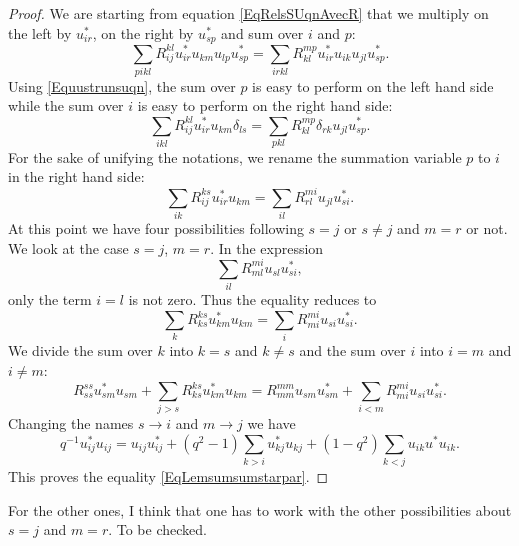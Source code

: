 \begin{proof}
    We are starting from equation \eqref{EqRelsSUqnAvecR} that we multiply on the left by \( u^*_{ir}\), on the right by \( u^*_{sp}\) and sum over \( i\) and \( p\):
    \begin{equation}
        \sum_{pikl}R^{kl}_{ij}u^*_{ir}u_{km}u_{lp}u^*_{sp}=\sum_{irkl}R^{mp}_{kl}u^*_{ir}u_{ik}u_{jl}u^*_{sp}.
    \end{equation}
    Using \eqref{Equustrunsuqn}, the sum over \( p\) is easy to perform on the left hand side while the sum over \( i\) is easy to perform on the right hand side:
    \begin{equation}
        \sum_{ikl}R^{kl}_{ij}u^*_{ir}u_{km}\delta_{ls}=\sum_{pkl}R^{mp}_{kl}\delta_{rk}u_{jl}u^*_{sp}.
    \end{equation}
    For the sake of unifying the notations, we rename the summation variable \( p\) to \( i\) in the right hand side:
    \begin{equation}
        \sum_{ik}R^{ks}_{ij}u^*_{ir}u_{km}=\sum_{il}R^{mi}_{rl}u_{jl}u^*_{si}.
    \end{equation}
    At this point we have four possibilities following \( s=j\) or \( s\neq j\) and \( m=r\) or not. We look at the case \( s=j\), \( m=r\). In the expression
    \begin{equation}
        \sum_{il}R^{mi}_{ml}u_{sl}u^*_{si},
    \end{equation}
    only the term \( i=l\) is not zero. Thus the equality reduces to
    \begin{equation}
        \sum_kR_{ks}^{ks}u^*_{km}u_{km}=\sum_iR^{mi}_{mi}u_{si}u^*_{si}.
    \end{equation}
    We divide the sum over \( k\) into \( k=s\) and \( k\neq s\) and the sum over \( i\) into \( i=m\) and \( i\neq m\):
    \begin{equation}
        R_{ss}^{ss}u^*_{sm}u_{sm}+\sum_{j>s}R^{ks}_{ks}u^*_{km}u_{km}=R_{mm}^{mm}u_{sm}u^*_{sm}+\sum_{i<m}R_{mi}^{mi}u_{si}u^*_{si}.
    \end{equation}
    Changing the names \( s\to i\) and \( m\to j\) we have
    \begin{equation}
        q^{-1}u^*_{ij}u_{ij}=u_{ij}u_{ij}^*+(q^2-1)\sum_{k>i}u^*_{kj}u_{kj}+(1-q^2)\sum_{k<j}u_{ik}u^*u_{ik}.
    \end{equation}
    This proves the equality \eqref{EqLemsumsumstarpar}.
\end{proof}

\begin{probleme}
    For the other ones, I think that one has to work with the other possibilities about \( s=j\) and \( m=r\). To be checked.
\end{probleme}

